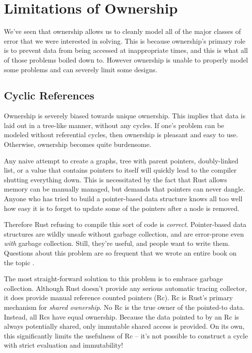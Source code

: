 \chapter{Limitations of Ownership}
\label{ch:limits}


We've seen that ownership allows us to cleanly model all of the major classes
of error that we were interested in solving. This is because ownership's primary
role is to prevent data from being accessed at inappropriate times, and this is
what all of those problems boiled down to. However ownership is unable to
properly model some problems and can severely limit some designs.





\section{Cyclic References}

Ownership is severely biased towards unique ownership. This implies that data
is laid out in a tree-like manner, without any cycles. If one's problem can
be modeled without referential cycles, then ownership is pleasant and easy to
use. Otherwise, ownership becomes quite burdensome.

Any naive attempt to create a graphs, tree with parent pointers, doubly-linked
list, or a value that contains pointers to itself will quickly lead to the
compiler shutting everything down. This is necessitated by the fact that Rust
allows memory can be manually managed, but demands that pointers can never dangle.
Anyone who has tried to build a pointer-based data structure knows all too well
how easy it is to forget to update some of the pointers after a node is removed.

Therefore Rust refusing to compile this sort of code is \emph{correct}. Pointer-based
data structures are wildly unsafe without garbage collection, and are error-prone
even \emph{with} garbage collection. Still, they're useful, and people want to write
them. Questions about this problem are so frequent that we wrote an entire book
on the topic \cite{too-many-lists}.

The most straight-forward solution to this problem is to embrace garbage collection.
Although Rust doesn't provide any serious automatic tracing collector, it does
provide manual reference counted pointers (Rc). Rc is Rust's primary mechanism for
\emph{shared ownership}. No Rc is the true owner of the pointed-to data. Instead,
all Rcs have equal ownership. Because the data pointed to by an Rc is always
potentially shared, only immutable shared access is provided. On its own,
this significantly limits the usefulness of Rc -- it's not possible to construct
a cycle with strict evaluation and immutability!

